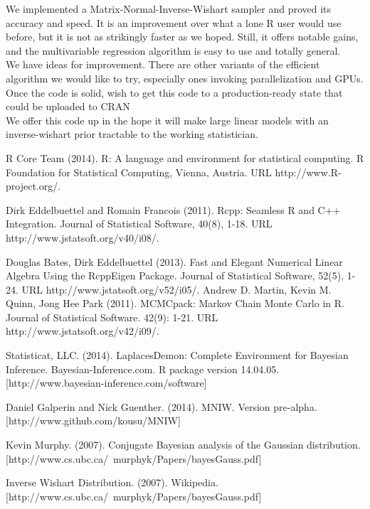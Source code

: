 \documentclass[english]{report}
\begin{document}

We implemented a Matrix-Normal-Inverse-Wishart sampler and proved its accuracy and speed. It is an improvement over what a lone R user would use before, but it is not as strikingly faster as we hoped. Still, it offers notable gains, and the multivariable regression algorithm is easy to use and totally general.\\

We have ideas for improvement. There are other variants of the efficient algorithm we would like to try, especially ones invoking parallelization and GPUs.  Once the code is solid, wish to get this code to a production-ready state that could be uploaded to CRAN \cite{R} \\

We offer this code \cite{MNIW} up in the hope it will make large linear models with an inverse-wishart prior tractable to the working statistician.



\newpage


\begin{thebibliography}{9}

R Core Team (2014). R: A language and environment for statistical computing. R Foundation for
  Statistical Computing, Vienna, Austria. URL http://www.R-project.org/.
  
 Dirk Eddelbuettel and Romain Francois (2011). Rcpp: Seamless R and C++ Integration. Journal of
  Statistical Software, 40(8), 1-18. URL http://www.jstatsoft.org/v40/i08/.

Douglas Bates, Dirk Eddelbuettel (2013). Fast and Elegant Numerical Linear Algebra Using the
  RcppEigen Package. Journal of Statistical Software, 52(5), 1-24. URL
  http://www.jstatsoft.org/v52/i05/.
Andrew D. Martin, Kevin M. Quinn, Jong Hee Park (2011). MCMCpack: Markov Chain Monte Carlo in R.
  Journal of Statistical Software. 42(9): 1-21. URL http://www.jstatsoft.org/v42/i09/. 
 
Statisticat, LLC. (2014). LaplacesDemon: Complete Environment for
  Bayesian Inference. Bayesian-Inference.com. R package version
  14.04.05. [http://www.bayesian-inference.com/software] 
 
Daniel Galperin and Nick Guenther. (2014). MNIW. Version pre-alpha. [http://www.github.com/kousu/MNIW]

Kevin Murphy. (2007). Conjugate Bayesian analysis of the Gaussian distribution. [http://www.cs.ubc.ca/~murphyk/Papers/bayesGauss.pdf] 

Inverse Wishart Distribution. (2007). Wikipedia. [http://www.cs.ubc.ca/~murphyk/Papers/bayesGauss.pdf] 
 
 \end{thebibliography}
\end{document}
